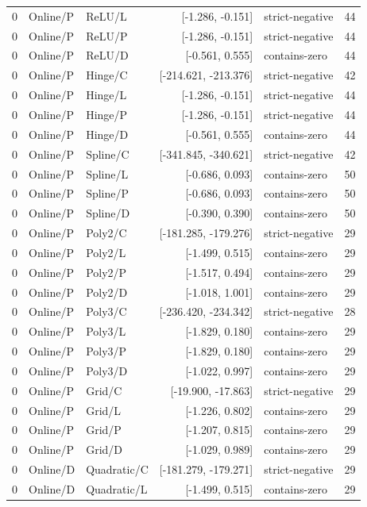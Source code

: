 \begin{longtable}{lllrlr}
0 & Online/P & ReLU/L & [-1.286, -0.151] & strict-negative & 44 \\
0 & Online/P & ReLU/P & [-1.286, -0.151] & strict-negative & 44 \\
0 & Online/P & ReLU/D & [-0.561, 0.555] & contains-zero & 44 \\
0 & Online/P & Hinge/C & [-214.621, -213.376] & strict-negative & 42 \\
0 & Online/P & Hinge/L & [-1.286, -0.151] & strict-negative & 44 \\
0 & Online/P & Hinge/P & [-1.286, -0.151] & strict-negative & 44 \\
0 & Online/P & Hinge/D & [-0.561, 0.555] & contains-zero & 44 \\
0 & Online/P & Spline/C & [-341.845, -340.621] & strict-negative & 42 \\
0 & Online/P & Spline/L & [-0.686, 0.093] & contains-zero & 50 \\
0 & Online/P & Spline/P & [-0.686, 0.093] & contains-zero & 50 \\
0 & Online/P & Spline/D & [-0.390, 0.390] & contains-zero & 50 \\
0 & Online/P & Poly2/C & [-181.285, -179.276] & strict-negative & 29 \\
0 & Online/P & Poly2/L & [-1.499, 0.515] & contains-zero & 29 \\
0 & Online/P & Poly2/P & [-1.517, 0.494] & contains-zero & 29 \\
0 & Online/P & Poly2/D & [-1.018, 1.001] & contains-zero & 29 \\
0 & Online/P & Poly3/C & [-236.420, -234.342] & strict-negative & 28 \\
0 & Online/P & Poly3/L & [-1.829, 0.180] & contains-zero & 29 \\
0 & Online/P & Poly3/P & [-1.829, 0.180] & contains-zero & 29 \\
0 & Online/P & Poly3/D & [-1.022, 0.997] & contains-zero & 29 \\
0 & Online/P & Grid/C & [-19.900, -17.863] & strict-negative & 29 \\
0 & Online/P & Grid/L & [-1.226, 0.802] & contains-zero & 29 \\
0 & Online/P & Grid/P & [-1.207, 0.815] & contains-zero & 29 \\
0 & Online/P & Grid/D & [-1.029, 0.989] & contains-zero & 29 \\
0 & Online/D & Quadratic/C & [-181.279, -179.271] & strict-negative & 29 \\
0 & Online/D & Quadratic/L & [-1.499, 0.515] & contains-zero & 29 \\

\end{longtable}
